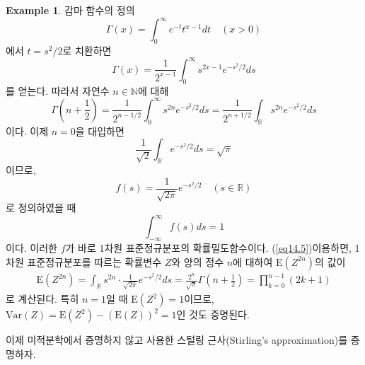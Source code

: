 \documentclass[11pt]{book}
\numberwithin{equation}{chapter}
\def\NN{\mathbb{N}}
\def\RR{\mathbb{R}}
\newcommand{\paren}[1]{\left(#1\right)}
\theoremstyle{definition}
\newtheorem*{ex}{Example}
\begin{document}
\begin{ex}
    감마 함수의 정의
    \[
    \Gamma(x) = \int_0^\infty e^{-t} t^{x-1} dt \quad (x > 0)    
    \]
    에서 \(t = s^2 / 2\)로 치환하면
    \[
        \Gamma(x) = \frac{1}{2^{x-1}} \int_0^\infty s^{2x-1} e^{-s^2/2} ds
    \]
    를 얻는다. 따라서 자연수 \(n \in \NN\)에 대해
    \begin{equation} \label{eq14.5}
        \Gamma\paren{n + \frac{1}{2}} = \frac{1}{2^{n-1/2}} \int_0^\infty s^{2n} e^{-s^2/2} ds = \frac{1}{2^{n +1/2}} \int_{\RR} s^{2n} e^{-s^2/2} ds 
    \end{equation}
    이다. 이제 \(n = 0\)을 대입하면
    \[
    \frac{1}{\sqrt{2}} \int_{\RR} e^{-s^2/2} ds = \sqrt{\pi}    
    \]
    이므로,
    \[
    f(s) = \frac{1}{\sqrt{2\pi}} e^{-s^2/2} \quad (s \in \RR)   
    \]
    로 정의하였을 때
    \[
    \int_{-\infty}^\infty f(s) ds = 1    
    \]
    이다. 이러한 \(f\)가 바로 1차원 표준정규분포의 확률밀도함수이다. (\ref{eq14.5})\를 이용하면, 1차원 표준정규분포를 따르는 확률변수 \(Z\)와 양의 정수 \(n\)에 대하여 \(\mathrm{E}(Z^{2n})\)의 값이
    \begin{align*}
        \mathrm{E}(Z^{2n}) = \int_{\RR} s^{2n} \cdot \frac{1}{\sqrt{2\pi}} e^{-s^2/2} ds = \frac{2^n}{\sqrt{\pi}} \Gamma \paren{n + \frac{1}{2}} = \prod_{k=0}^{n-1} (2k+1)
    \end{align*}
    로 계산된다. 특히 \(n = 1\)일 때 \(\mathrm{E}(Z^2) = 1\)이므로, \(\mathrm{Var}(Z) = \mathrm{E}(Z^2) - (\mathrm{E}(Z))^2 = 1\)인 것도 증명된다.
\end{ex}

이제 미적분학에서 증명하지 않고 사용한 스털링 근사(Stirling's approximation)를 증명하자.
\end{document}
